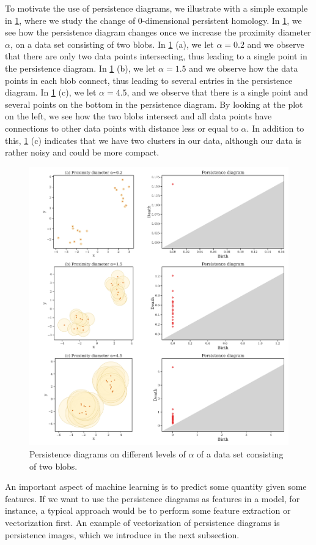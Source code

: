 To motivate the use of persistence diagrams, we illustrate with a simple example in \cref{fig:persistence-diagram-example}, where we study the change of 0-dimensional persistent homology. In \cref{fig:persistence-diagram-example}, we see how the persistence diagram changes once we increase the proximity diameter $\alpha$, on a data set consisting of two blobs. In \cref{fig:persistence-diagram-example} (a), we let $\alpha=0.2$ and we observe that there are only two data points intersecting, thus leading to a single point in the persistence diagram. In \cref{fig:persistence-diagram-example} (b), we let $\alpha=1.5$ and we observe how the data points in each blob connect, thus leading to several entries in the persistence diagram. In \cref{fig:persistence-diagram-example} (c), we let $\alpha=4.5$, and we observe that there is a single point and several points on the bottom in the persistence diagram. By looking at the plot on the left, we see how the two blobs intersect and all data points have connections to other data points with distance less or equal to $\alpha$. In addition to this, \cref{fig:persistence-diagram-example} (c) indicates that we have two clusters in our data, although our data is rather noisy and could be more compact.
\begin{figure}[H]
    \centering
    \includegraphics[width=1\textwidth]{thesis/figures/persistence-diagram-example.pdf}
    \caption{Persistence diagrams on different levels of $\alpha$ of a data set consisting of two blobs.}
    \label{fig:persistence-diagram-example}
\end{figure}
An important aspect of machine learning is to predict some quantity given some features. If we want to use the persistence diagrams as features in a model, for instance, a typical approach would be to perform some feature extraction or vectorization first. An example of vectorization of persistence diagrams is persistence images, which we introduce in the next subsection.

